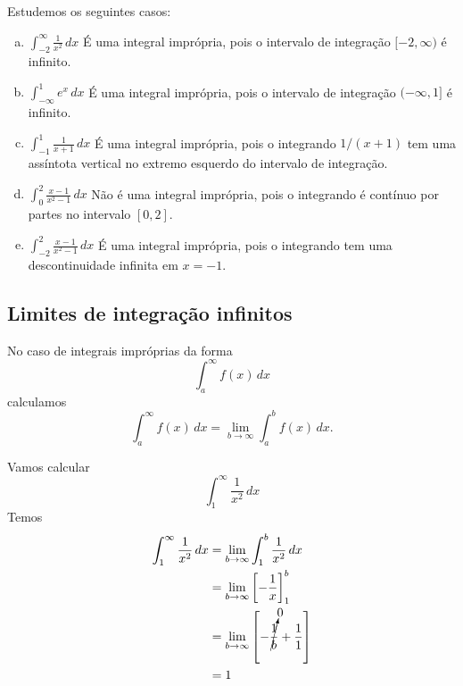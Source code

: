\begin{ex}
  Estudemos os seguintes casos:
  \begin{enumerate}[a)]
  \item $\displaystyle\int_{-2}^\infty \frac{1}{x^2}\,dx$
    É uma integral imprópria, pois o intervalo de integração $[-2, \infty)$ é infinito.
  \item $\displaystyle\int_{-\infty}^{1}e^{x}\,dx$
    É uma integral imprópria, pois o intervalo de integração $(-\infty, 1]$ é infinito.
  \item $\displaystyle\int_{-1}^{1}\frac{1}{x+1}\,dx$
    É uma integral imprópria, pois o integrando $1/(x+1)$ tem uma assíntota vertical no extremo esquerdo do intervalo de integração.
  \item $\displaystyle\int_{0}^2\frac{x-1}{x^2-1}\,dx$
    Não é uma integral imprópria, pois o integrando é contínuo por partes no intervalo $[0,2]$.
  \item $\displaystyle\int_{-2}^2\frac{x-1}{x^2-1}\,dx$
    É uma integral imprópria, pois o integrando tem uma descontinuidade infinita em $x=-1$.
  \end{enumerate}
\end{ex}

\subsection{Limites de integração infinitos}

No caso de integrais impróprias da forma
\begin{equation}
  \int_a^\infty f(x)\,dx
\end{equation}
calculamos
\begin{equation}
  \int_a^\infty f(x)\,dx = \lim_{b\to\infty}\int_a^bf(x)\,dx.
\end{equation}

\begin{ex}
  Vamos calcular
  \begin{equation}
    \int_1^\infty\frac{1}{x^2}\,dx
  \end{equation}
  Temos
  \begin{align}
    \int_1^\infty\frac{1}{x^2}\,dx &= \lim_{b\to\infty}\int_1^b\frac{1}{x^2}\,dx\\
                                   &= \lim_{b\to\infty} \left[-\frac{1}{x}\right]_1^b\\
                                   &= \lim_{b\to\infty} \left[-\cancelto{0}{\frac{1}{b}} + \frac{1}{1}\right]\\
                                   &= 1
  \end{align}
\end{ex}

